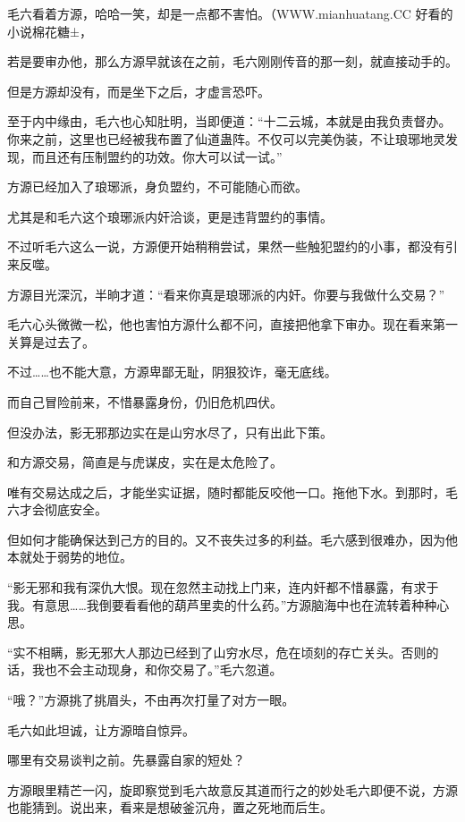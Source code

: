 
\begin{this_body}

毛六看着方源，哈哈一笑，却是一点都不害怕。（WWW.mianhuatang.CC 好看的小说棉花糖±，

若是要审办他，那么方源早就该在之前，毛六刚刚传音的那一刻，就直接动手的。

但是方源却没有，而是坐下之后，才虚言恐吓。

至于内中缘由，毛六也心知肚明，当即便道：“十二云城，本就是由我负责督办。你来之前，这里也已经被我布置了仙道蛊阵。不仅可以完美伪装，不让琅琊地灵发现，而且还有压制盟约的功效。你大可以试一试。”

方源已经加入了琅琊派，身负盟约，不可能随心而欲。

尤其是和毛六这个琅琊派内奸洽谈，更是违背盟约的事情。

不过听毛六这么一说，方源便开始稍稍尝试，果然一些触犯盟约的小事，都没有引来反噬。

方源目光深沉，半晌才道：“看来你真是琅琊派的内奸。你要与我做什么交易？”

毛六心头微微一松，他也害怕方源什么都不问，直接把他拿下审办。现在看来第一关算是过去了。

不过……也不能大意，方源卑鄙无耻，阴狠狡诈，毫无底线。

而自己冒险前来，不惜暴露身份，仍旧危机四伏。

但没办法，影无邪那边实在是山穷水尽了，只有出此下策。

和方源交易，简直是与虎谋皮，实在是太危险了。

唯有交易达成之后，才能坐实证据，随时都能反咬他一口。拖他下水。到那时，毛六才会彻底安全。

但如何才能确保达到己方的目的。又不丧失过多的利益。毛六感到很难办，因为他本就处于弱势的地位。

“影无邪和我有深仇大恨。现在忽然主动找上门来，连内奸都不惜暴露，有求于我。有意思……我倒要看看他的葫芦里卖的什么药。”方源脑海中也在流转着种种心思。

“实不相瞒，影无邪大人那边已经到了山穷水尽，危在顷刻的存亡关头。否则的话，我也不会主动现身，和你交易了。”毛六忽道。

“哦？”方源挑了挑眉头，不由再次打量了对方一眼。

毛六如此坦诚，让方源暗自惊异。

哪里有交易谈判之前。先暴露自家的短处？

方源眼里精芒一闪，旋即察觉到毛六故意反其道而行之的妙处毛六即便不说，方源也能猜到。说出来，看来是想破釜沉舟，置之死地而后生。


\end{this_body}
